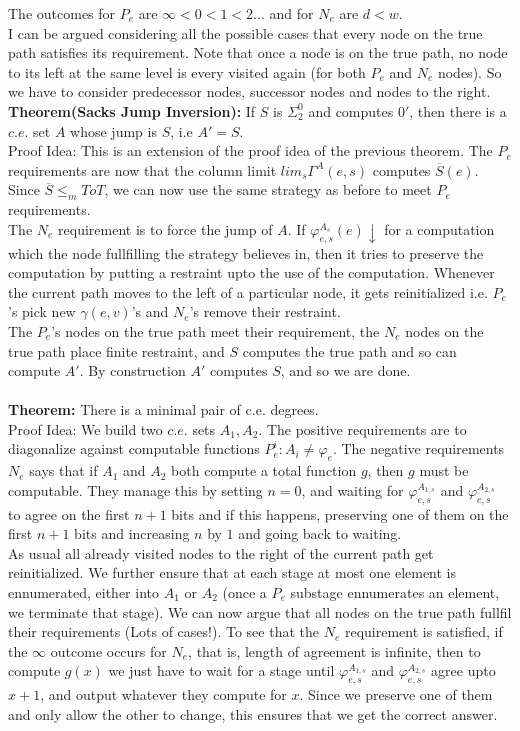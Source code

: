 \documentclass{article}
\begin{document}
	The outcomes for $P_e$ are $\infty < 0 < 1 < 2...$ and for $N_e$ are $d<w$.\\
	I can be argued considering all the possible cases that every node on the true path satisfies its requirement. Note that once a node is on the true path, no node to its left at the same level is every visited again (for both $P_e$ and $N_e$ nodes). So we have to consider predecessor nodes, successor nodes and nodes to the right.
	\\
	\textbf{Theorem(Sacks Jump Inversion):} If $S$ is $\Sigma^0_2$ and computes $0'$, then there is a $c.e.$ set $A$ whose jump is $S$, i.e $A' = S$.\\
	Proof Idea: This is an extension of the proof idea of the previous theorem. The $P_e$ requirements are now that the column limit $lim_s \Gamma^A(e,s)$ computes $\overline{S}(e)$. Since $\overline{S} \leq_m ToT$, we can now use the same strategy as before to meet $P_e$ requirements.\\
	The $N_e$ requirement is to force the jump of $A$. If $\varphi^{A_s}_{e,s}(e) \downarrow$ for a computation which the node fullfilling the strategy believes in, then it tries to preserve the computation by putting a restraint upto the use of the computation. Whenever the current path moves to the left of a particular node, it gets reinitialized i.e. $P_e$'s pick new $\gamma(e,v)$'s and $N_e$'s remove their restraint.\\
	The $P_e$'s nodes on the true path meet their requirement, the $N_e$ nodes on the true path place finite restraint, and $S$ computes the true path and so can compute $A'$. By construction $A'$ computes $S$, and so we are done.\\
	\\
	\textbf{Theorem: } There is a minimal pair of c.e. degrees.\\
	Proof Idea: We build two $c.e.$ sets $A_1,A_2$. The positive requirements are to diagonalize against computable functions $P_e^i: A_i \neq \varphi_e$. The negative requirements $N_e$ says that if $A_1$ and $A_2$ both compute a total function $g$, then $g$ must be computable. They manage this by setting $n=0$, and waiting for $\varphi_{e,s}^{A_{1,s}}$ and $\varphi_{e,s}^{A_{2,s}}$ to agree on the first $n+1$ bits and if this happens, preserving one of them on the first $n+1$ bits and increasing $n$ by $1$ and going back to waiting.
	\\
	As usual all already visited nodes to the right of the current path get reinitialized. We further ensure that at each stage at most one element is ennumerated, either into $A_1$ or $A_2$ (once a $P_e$ substage ennumerates an element, we terminate that stage). We can now argue that all nodes on the true path fullfil their requirements (Lots of cases!). To see that the $N_e$ requirement is satisfied, if the $\infty$ outcome occurs for $N_e$, that is, length of agreement is infinite, then to compute $g(x)$ we just have to wait for a stage until $\varphi_{e,s}^{A_{1,s}}$ and $\varphi_{e,s}^{A_{2,s}}$ agree upto $x+1$, and output whatever they compute for $x$. Since we preserve one of them and only allow the other to change, this ensures that we get the correct answer.\\
\end{document}
